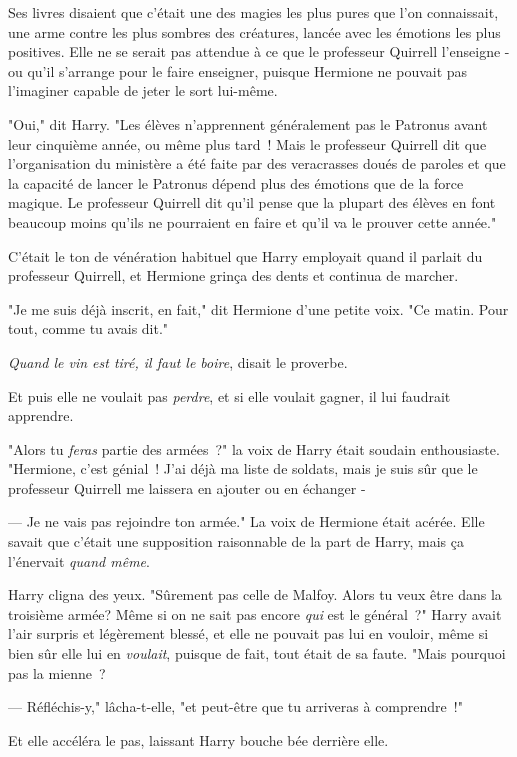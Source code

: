 Ses livres disaient que c'était une des magies les plus pures que l'on connaissait, une arme contre les plus sombres des créatures, lancée avec les émotions les plus positives. Elle ne se serait pas attendue à ce que le professeur Quirrell l'enseigne - ou qu'il s'arrange pour le faire enseigner, puisque Hermione ne pouvait pas l'imaginer capable de jeter le sort lui-même.

"Oui," dit Harry. "Les élèves n'apprennent généralement pas le Patronus avant leur cinquième année, ou même plus tard~! Mais le professeur Quirrell dit que l'organisation du ministère a été faite par des veracrasses doués de paroles et que la capacité de lancer le Patronus dépend plus des émotions que de la force magique. Le professeur Quirrell dit qu'il pense que la plupart des élèves en font beaucoup moins qu'ils ne pourraient en faire et qu'il va le prouver cette année."

C'était le ton de vénération habituel que Harry employait quand il parlait du professeur Quirrell, et Hermione grinça des dents et continua de marcher.

"Je me suis déjà inscrit, en fait," dit Hermione d'une petite voix. "Ce matin. Pour tout, comme tu avais dit."

\emph{Quand le vin est tiré, il faut le boire}, disait le proverbe.

Et puis elle ne voulait pas \emph{perdre}, et si elle voulait gagner, il lui faudrait apprendre.

"Alors tu \emph{feras} partie des armées~?" la voix de Harry était soudain enthousiaste. "Hermione, c'est génial~! J'ai déjà ma liste de soldats, mais je suis sûr que le professeur Quirrell me laissera en ajouter ou en échanger -

--- Je ne vais pas rejoindre ton armée." La voix de Hermione était acérée. Elle savait que c'était une supposition raisonnable de la part de Harry, mais ça l'énervait \emph{quand même}.

Harry cligna des yeux. "Sûrement pas celle de Malfoy. Alors tu veux être dans la troisième armée? Même si on ne sait pas encore \emph{qui} est le général~?" Harry avait l'air surpris et légèrement blessé, et elle ne pouvait pas lui en vouloir, même si bien sûr elle lui en \emph{voulait}, puisque de fait, tout était de sa faute. "Mais pourquoi pas la mienne~?

--- Réfléchis-y," lâcha-t-elle, "et peut-être que tu arriveras à comprendre~!"

Et elle accéléra le pas, laissant Harry bouche bée derrière elle.

